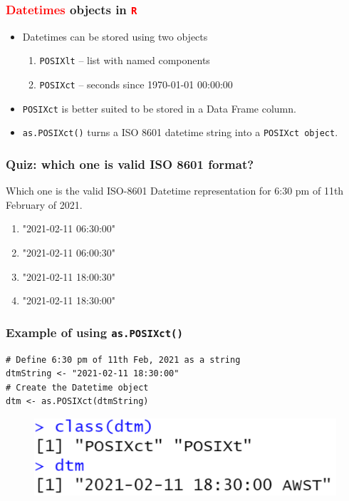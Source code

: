 \documentclass{beamer}
\begin{document}
\begin{frame}\frametitle{\textbf{\textcolor{red}{Datetimes}} objects in \texttt{\textcolor{red}{R}}}
\begin{itemize}
\item Datetimes can be stored using two objects
\begin{enumerate}
\item \texttt{POSIXlt} -- list with named components
\item \texttt{POSIXct} -- seconds since 1970-01-01 00:00:00
\end{enumerate} 
\item \texttt{POSIXct} is better suited to be stored in a Data Frame column.
\item \texttt{as.POSIXct()} turns a ISO 8601 datetime string into a \texttt{POSIXct object}.
\end{itemize}
\end{frame}

\begin{frame}\frametitle{Quiz: which one is valid ISO 8601 format?}
Which one is the valid ISO-8601 Datetime representation for 6:30 pm of 11th February of 2021.
{\Large

\begin{enumerate}
\centering
\item "2021-02-11 06:30:00"
\item "2021-02-11 06:00:30"
\item "2021-02-11 18:00:30"
\item "2021-02-11 18:30:00"
\end{enumerate} 
}
\end{frame}

\begin{frame}[fragile]\frametitle{Example of using \texttt{as.POSIXct()}}
\begin{lstlisting}
# Define 6:30 pm of 11th Feb, 2021 as a string
dtmString <- "2021-02-11 18:30:00"
# Create the Datetime object
dtm <- as.POSIXct(dtmString)
\end{lstlisting}
\begin{figure}
\includegraphics[width=0.99\linewidth]{PlotsLec4/DatetimeObj}
\end{figure}
\end{frame}
\end{document}
